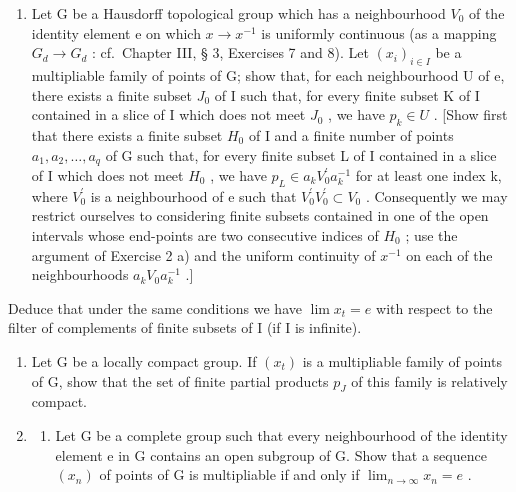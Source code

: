 \begin{enumerate}
\def\labelenumi{\arabic{enumi})}
\setcounter{enumi}{2}
\tightlist
\item
  Let G be a Hausdorff topological group which has a neighbourhood \(V_{0}\) of the identity element e on which \(x \to x^{-1}\) is uniformly continuous (as a mapping \(G_{d} \to G_{d}\) : cf.~Chapter III, § 3, Exercises 7 and 8). Let \((x_{i})_{i\in I}\) be a multipliable family of points of G; show that, for each neighbourhood U of e, there exists a finite subset \(J_{0}\) of I such that, for every finite subset K of I contained in a slice of I which does not meet \(J_{0}\) , we have \(p_{k}\in U\) . {[}Show first that there exists a finite subset \(H_{0}\) of I and a finite number of points \(a_{1},a_{2},\ldots,a_{q}\) of G such that, for every finite subset L of I contained in a slice of I which does not meet \(H_{0}\) , we have \(p_{L}\in a_{k}V_{0}^{\prime}a_{k}^{-1}\) for at least one index k, where \(V_{0}^{\prime}\) is a neighbourhood of e such that \(V_{0}^{\prime}V_{0}^{\prime}\subset V_{0}\) . Consequently we may restrict ourselves to considering finite subsets contained in one of the open intervals whose end-points are two consecutive indices of \(H_{0}\) ; use the argument of Exercise 2 a) and the uniform continuity of \(x^{-1}\) on each of the neighbourhoods \(a_{k}V_{0}a_{k}^{-1}\) .{]}
\end{enumerate}

Deduce that under the same conditions we have \(\lim x_{t}=e\) with respect to the filter of complements of finite subsets of I (if I is infinite).

\begin{enumerate}
\def\labelenumi{\arabic{enumi})}
\setcounter{enumi}{3}
\item
  Let G be a locally compact group. If \((x_{t})\) is a multipliable family of points of G, show that the set of finite partial products \(p_{J}\) of this family is relatively compact.
\item
  \begin{enumerate}
  \def\labelenumii{\alph{enumii})}
  \tightlist
  \item
    Let G be a complete group such that every neighbourhood of the identity element e in G contains an open subgroup of G. Show that a sequence \((x_{n})\) of points of G is multipliable if and only if \(\lim_{n\to\infty}x_{n}=e\) .
  \end{enumerate}
\end{enumerate}

